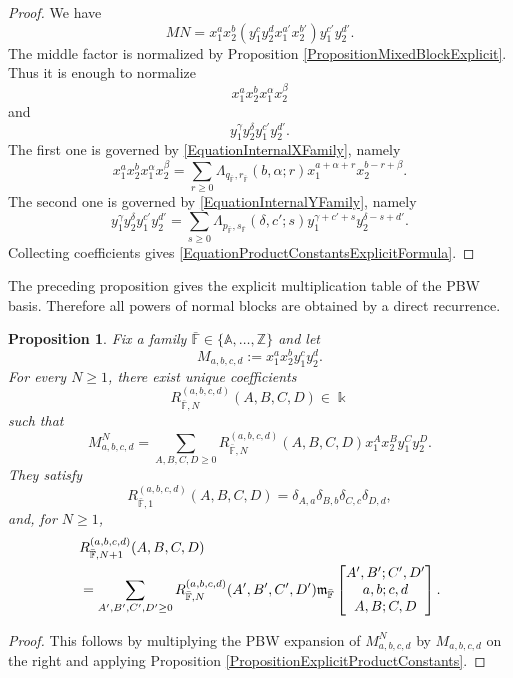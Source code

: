 \documentclass{amsart}
\newtheorem{proposition}[theorem]{Proposition}
\theoremstyle{definition}
\theoremstyle{remark}
\numberwithin{equation}{section}
\begin{document}
\begin{proof}
We have
\[
MN
=
x_1^ax_2^b
\left(
y_1^cy_2^dx_1^{a'}x_2^{b'}
\right)
y_1^{c'}y_2^{d'}.
\]
The middle factor is normalized by Proposition \ref{PropositionMixedBlockExplicit}. Thus it is enough to normalize
\[
x_1^ax_2^b x_1^\alpha x_2^\beta
\]
and
\[
y_1^\gamma y_2^\delta y_1^{c'}y_2^{d'}.
\]
The first one is governed by \eqref{EquationInternalXFamily}, namely
\[
x_1^ax_2^b x_1^\alpha x_2^\beta
=
\sum_{r\ge0}
\Lambda_{q_{\bar{\mathbb{F}}},r_{\bar{\mathbb{F}}}}(b,\alpha;r)
x_1^{a+\alpha+r}x_2^{b-r+\beta}.
\]
The second one is governed by \eqref{EquationInternalYFamily}, namely
\[
y_1^\gamma y_2^\delta y_1^{c'}y_2^{d'}
=
\sum_{s\ge0}
\Lambda_{p_{\bar{\mathbb{F}}},s_{\bar{\mathbb{F}}}}(\delta,c';s)
y_1^{\gamma+c'+s}y_2^{\delta-s+d'}.
\]
Collecting coefficients gives \eqref{EquationProductConstantsExplicitFormula}.
\end{proof}

The preceding proposition gives the explicit multiplication table of the PBW basis. Therefore all powers of normal blocks are obtained by a direct recurrence.

\begin{proposition}\label{PropositionExplicitBlockPowersFamily}
Fix a family $\bar{\mathbb{F}}\in\{\mathbb{A},\ldots,\mathbb{Z}\}$ and let
\[
M_{a,b,c,d}:=x_1^ax_2^by_1^cy_2^d.
\]
For every $N\ge1$, there exist unique coefficients
\[
R_{\bar{\mathbb{F}},N}^{(a,b,c,d)}(A,B,C,D)\in\Bbbk
\]
such that
\begin{equation}\label{EquationExplicitBlockPowerFamily}
M_{a,b,c,d}^{N}
=
\sum_{A,B,C,D\ge0}
R_{\bar{\mathbb{F}},N}^{(a,b,c,d)}(A,B,C,D)
x_1^Ax_2^By_1^Cy_2^D.
\end{equation}
They satisfy
\[
R_{\bar{\mathbb{F}},1}^{(a,b,c,d)}(A,B,C,D)
=
\delta_{A,a}\delta_{B,b}\delta_{C,c}\delta_{D,d},
\]
and, for $N\ge1$,
\begin{align}
&R_{\bar{\mathbb{F}},N+1}^{(a,b,c,d)}(A,B,C,D)
\notag\\
&=
\sum_{A',B',C',D'\ge0}
R_{\bar{\mathbb{F}},N}^{(a,b,c,d)}(A',B',C',D')
\mathfrak{m}_{\bar{\mathbb{F}}}
\begin{bmatrix}
A',B';C',D'\\
a,b;c,d\\
A,B;C,D
\end{bmatrix}.
\label{EquationExplicitBlockPowerRecursionFamily}
\end{align}
\end{proposition}

\begin{proof}
This follows by multiplying the PBW expansion of $M_{a,b,c,d}^{N}$ by $M_{a,b,c,d}$ on the right and applying Proposition \ref{PropositionExplicitProductConstants}.
\end{proof}
\end{document}
